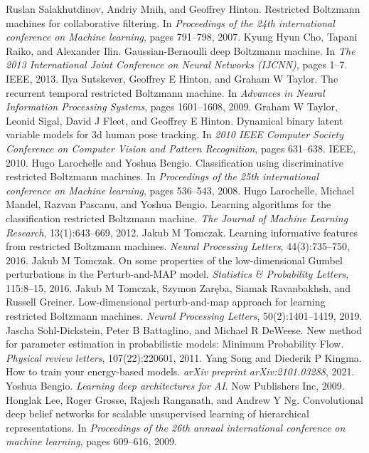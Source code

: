 \begin{chapterreferences}
 Ruslan Salakhutdinov, Andriy Mnih, and Geoffrey Hinton. Restricted Boltzmann machines for collaborative filtering. In \emph{Proceedings of the 24th international conference on Machine learning}, pages 791–798, 2007.
 Kyung Hyun Cho, Tapani Raiko, and Alexander Ilin. Gaussian-Bernoulli deep Boltzmann machine. In \emph{The 2013 International Joint Conference on Neural Networks (IJCNN)}, pages 1–7. IEEE, 2013.
 Ilya Sutskever, Geoffrey E Hinton, and Graham W Taylor. The recurrent temporal restricted Boltzmann machine. In \emph{Advances in Neural Information Processing Systems}, pages 1601–1608, 2009.
 Graham W Taylor, Leonid Sigal, David J Fleet, and Geoffrey E Hinton. Dynamical binary latent variable models for 3d human pose tracking. In \emph{2010 IEEE Computer Society Conference on Computer Vision and Pattern Recognition}, pages 631–638. IEEE, 2010.
 Hugo Larochelle and Yoshua Bengio. Classification using discriminative restricted Boltzmann machines. In \emph{Proceedings of the 25th international conference on Machine learning}, pages 536–543, 2008.
 Hugo Larochelle, Michael Mandel, Razvan Pascanu, and Yoshua Bengio. Learning algorithms for the classification restricted Boltzmann machine. \emph{The Journal of Machine Learning Research}, 13(1):643–669, 2012.
 Jakub M Tomczak. Learning informative features from restricted Boltzmann machines. \emph{Neural Processing Letters}, 44(3):735–750, 2016.
 Jakub M Tomczak. On some properties of the low-dimensional Gumbel perturbations in the Perturb-and-MAP model. \emph{Statistics \& Probability Letters}, 115:8–15, 2016.
 Jakub M Tomczak, Szymon Zaręba, Siamak Ravanbakhsh, and Russell Greiner. Low-dimensional perturb-and-map approach for learning restricted Boltzmann machines. \emph{Neural Processing Letters}, 50(2):1401–1419, 2019.
 Jascha Sohl-Dickstein, Peter B Battaglino, and Michael R DeWeese. New method for parameter estimation in probabilistic models: Minimum Probability Flow. \emph{Physical review letters}, 107(22):220601, 2011.
 Yang Song and Diederik P Kingma. How to train your energy-based models. \emph{arXiv preprint arXiv:2101.03288}, 2021.
 Yoshua Bengio. \emph{Learning deep architectures for AI}. Now Publishers Inc, 2009.
 Honglak Lee, Roger Grosse, Rajesh Ranganath, and Andrew Y Ng. Convolutional deep belief networks for scalable unsupervised learning of hierarchical representations. In \emph{Proceedings of the 26th annual international conference on machine learning}, pages 609–616, 2009.

\end{chapterreferences}
